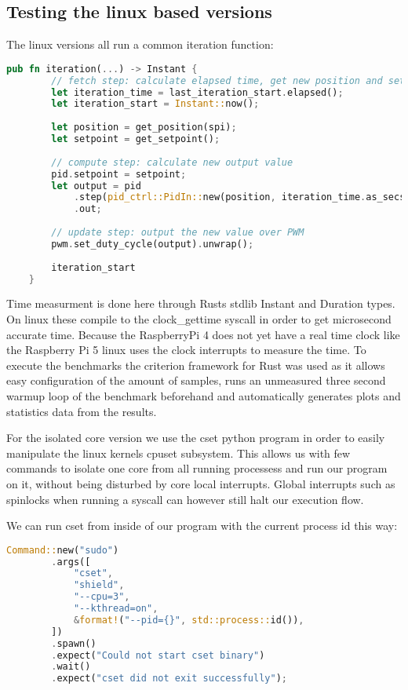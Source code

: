\subsection{Testing the linux based versions}
The linux versions all run a common iteration function:
\begin{lstlisting}[language=Rust,style=colouredRust]
    pub fn iteration(...) -> Instant {
        // fetch step: calculate elapsed time, get new position and setpoint
        let iteration_time = last_iteration_start.elapsed();
        let iteration_start = Instant::now();
    
        let position = get_position(spi);
        let setpoint = get_setpoint();
    
        // compute step: calculate new output value
        pid.setpoint = setpoint;
        let output = pid
            .step(pid_ctrl::PidIn::new(position, iteration_time.as_secs_f64()))
            .out;
    
        // update step: output the new value over PWM
        pwm.set_duty_cycle(output).unwrap();
    
        iteration_start
    }
\end{lstlisting}

Time measurment is done here through Rusts stdlib Instant and Duration types.
On linux these compile to the clock\_gettime syscall in order to get microsecond accurate time.
Because the RaspberryPi 4 does not yet have a real time clock like the Raspberry Pi 5 linux uses the clock interrupts to measure the time.
To execute the benchmarks the criterion framework for Rust was used as it allows easy configuration of the amount of samples,
runs an unmeasured three second warmup loop of the benchmark beforehand and automatically generates plots and statistics data from the results.

For the isolated core version we use the cset python program in order to easily manipulate the linux kernels cpuset subsystem.
This allows us with few commands to isolate one core from all running processess and run our program on it, without being disturbed by core local interrupts.
Global interrupts such as spinlocks when running a syscall can however still halt our execution flow.

We can run cset from inside of our program with the current process id this way:
\begin{lstlisting}[language=Rust,style=colouredRust]
    Command::new("sudo")
        .args([
            "cset",
            "shield",
            "--cpu=3",
            "--kthread=on",
            &format!("--pid={}", std::process::id()),
        ])
        .spawn()
        .expect("Could not start cset binary")
        .wait()
        .expect("cset did not exit successfully");
\end{lstlisting}

